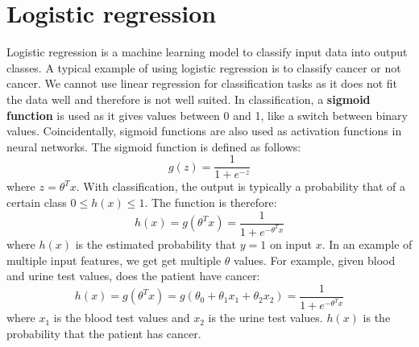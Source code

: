 \documentclass[CS5104-Notes.tex]{subfiles}
\begin{document}
\section{Logistic regression}
Logistic regression is a machine learning model to classify input data into output classes. A typical example of using logistic regression is to classify cancer or not cancer. We cannot use linear regression for classification tasks as it does not fit the data well and therefore is not well suited. In classification, a \textbf{sigmoid function} is used as it gives values between 0 and 1, like a switch between binary values. Coincidentally, sigmoid functions are also used as activation functions in neural networks. 
\n
The sigmoid function is defined as follows:
\begin{equation}
g(z) = \frac{1}{1 + e^{-z}}
\end{equation}
where $z = \theta^{T}x$. With classification, the output is typically a probability that of a certain class $ 0 \leq h(x) \leq 1$. The function is therefore:
\begin{equation}
h(x) = g(\theta^{T}x) = \frac{1}{1 + e^{-\theta^{T}x}}
\end{equation}
where $h(x)$ is the estimated probability that $y = 1$ on input $x$. In an example of multiple input features, we get get multiple $\theta$ values. For example, given blood and urine test values, does the patient have cancer:
\begin{equation}
h(x) = g(\theta^{T}x) = g(\theta_{0} + \theta_{1}x_{1} + \theta_{2}x_{2}) =  \frac{1}{1 + e^{-\theta^{T}x}}
\end{equation}
where $x_{1}$ is the blood test values and $x_{2}$ is the urine test values. $h(x)$ is the probability that the patient has cancer.
\end{document}

